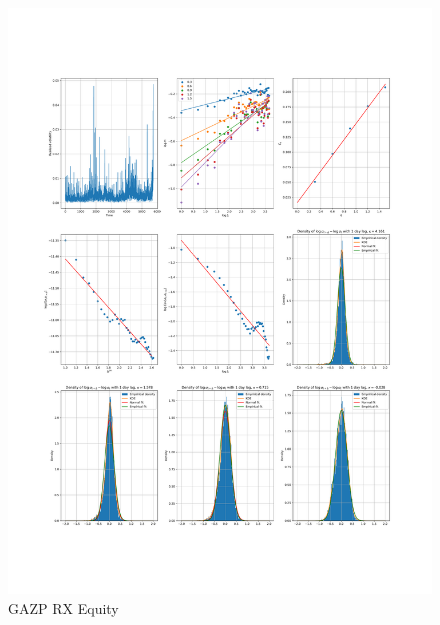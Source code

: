     \begin{figure}[h]
        \includegraphics[width=\textwidth]{fig/GAZP RX Equity.pdf}
        \caption{GAZP RX Equity}
    \end{figure} 
        
